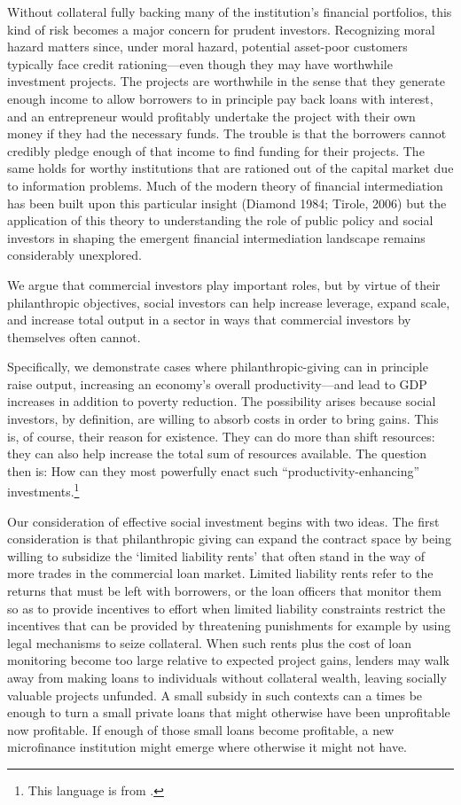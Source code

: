\documentclass[letterpaper, 12pt]{article}
\begin{document}
Without collateral fully backing many of the institution's financial portfolios, this kind of risk becomes a major concern for prudent
investors. Recognizing moral hazard matters since, under moral hazard, potential asset-poor customers typically face credit rationing---even
though they may have worthwhile investment projects. The projects are worthwhile in the sense that they generate enough income to allow borrowers to in principle pay back loans with interest, and an entrepreneur would profitably undertake the project with their own money if they had the necessary funds.  The trouble is that the borrowers cannot credibly pledge enough of that income to find funding for their projects. The same holds for worthy institutions that are rationed out of the capital market due to
information problems. Much of the modern theory of financial intermediation has been built upon this particular insight (Diamond 1984; Tirole, 2006) but the application of this theory to understanding the role of public policy and social investors in shaping the emergent
financial intermediation landscape remains considerably unexplored.

We argue that commercial investors play important roles, but by virtue of their philanthropic objectives, social investors can help increase leverage, expand scale, and increase total output in a sector in ways that commercial investors by themselves often cannot.

Specifically, we demonstrate cases where philanthropic-giving can in principle raise output, increasing an economy's overall productivity---and lead to GDP increases in addition to poverty reduction. The possibility arises because social investors, by
definition, are willing to absorb costs in order to bring gains. This is, of course, their reason for existence. They can do more than shift resources: they can also help increase the total sum of resources available. The question then is: How can they most powerfully enact such
``productivity-enhancing'' investments.\footnote{This language is from \citet{bardhan2000}.}

Our consideration of effective social investment begins with two ideas. The first consideration is that philanthropic giving can expand the contract space by being willing to subsidize the `limited liability
rents' that often stand in the way of more trades in the commercial loan market. Limited liability rents refer to the returns that must be left with borrowers, or the loan officers that monitor them so as to provide incentives to effort when limited liability constraints restrict the
incentives that can be provided by threatening punishments for example
by using legal mechanisms to seize collateral. When such rents plus the
cost of loan monitoring become too large relative to expected project
gains, lenders may walk away from making loans to individuals without
collateral wealth, leaving socially valuable projects unfunded. A small
subsidy in such contexts can a times be enough to turn a small private
loans that might otherwise have been unprofitable now profitable. If
enough of those small loans become profitable, a new microfinance
institution might emerge where otherwise it might not have.
\end{document}
